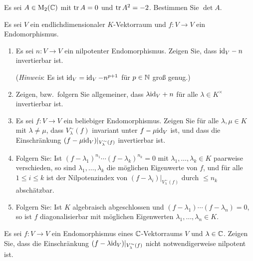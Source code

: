 

\begin{question}{2}
  Es sei $A \in \operatorname{M}_2(\mathbb{C})$ mit $\operatorname{tr} A = 0$ und $\operatorname{tr} A^2 = -2$.
  Bestimmen Sie $\det A$.
\end{question}


\begin{question}[subtitle = Zu Haupträumen]{2}
  Es sei $V$ ein endlichdimensionaler $K$-Vektorraum und $f \colon V \to V$ ein Endomorphismus.
  \begin{enumerate}[leftmargin=*]
    \item
      Es sei $n \colon V \to V$ ein nilpotenter Endomorphismus.
      Zeigen Sie, dass ${\operatorname{id}_V} - n$ invertierbar ist.
      
      (\emph{Hinweis}:
       Es ist $\operatorname{id}_V = \operatorname{id}_V - n^{p+1}$ für $p \in \mathbb{N}$ groß genug.)
    \item
      Zeigen, bzw.\ folgern Sie allgemeiner, dass $\lambda {\operatorname{id}_V} + n$ für alle $\lambda \in K^\times$ invertierbar ist.
    \item
      Es sei $f \colon V \to V$ ein beliebiger Endomorphismus.
      Zeigen Sie für alle $\lambda, \mu \in K$ mit $\lambda \neq \mu$, dass $V^\sim_\lambda(f)$ invariant unter $f - \mu {\operatorname{id}_V}$ ist, und dass die Einschränkung $(f - \mu {\operatorname{id}_V})|_{V^\sim_\lambda(f)}$ invertierbar ist.
    \item
      Folgern Sie:
      Ist $(f - \lambda_1)^{n_1} \dotsm (f - \lambda_k)^{n_k} = 0$ mit $\lambda_1, \dotsc, \lambda_k \in K$ paarweise verschieden, so sind $\lambda_1, \dotsc, \lambda_k$ die möglichen Eigenwerte von $f$, und für alle $1 \leq i \leq k$ ist der Nilpotenzindex von $(f - \lambda_i)|_{V^\sim_\lambda(f)}$ durch $\leq n_k$ abschätzbar.
    \item
      Folgern Sie:
      Ist $K$ algebraisch abgeschlossen und $(f - \lambda_1) \dotsm (f - \lambda_n) = 0$, so ist $f$ diagonalisierbar mit möglichen Eigenwerten $\lambda_1, \dotsc, \lambda_n \in K$.
  \end{enumerate}
\end{question}


\begin{question}[subtitle = Ein Gegenbeispiel]{2}
  Es sei $f \colon V \to V$ ein Endomorphismus eines $\mathbb{C}$-Vektorraums $V$ und $\lambda \in \mathbb{C}$.
  Zeigen Sie, dass die Einschränkung $(f - \lambda {\operatorname{id}_V})|_{V^\sim_\lambda(f)}$ nicht notwendigerweise nilpotent ist.
\end{question}


